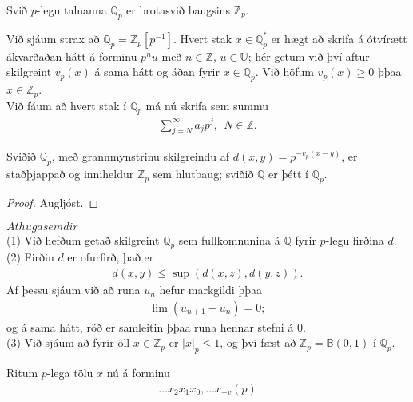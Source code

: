 \begin{skilgr}
 Svið $p$-legu talnanna $\mathbb{Q}_p$ er brotasvið baugsins $\mathbb{Z}_p$.
\end{skilgr}
Við sjáum strax að $\mathbb{Q}_p = \mathbb{Z}_p[p^{-1}]$. Hvert stak 
$x \in \mathbb{Q}_p^*$ er hægt að skrifa á ótvírætt ákvarðaðan hátt á forminu 
$p^nu$ með $n \in \mathbb{Z}$, $u \in \mathbb{U}$; hér getum við því aftur 
skilgreint $v_p(x)$ á sama hátt og áðan fyrir $x \in \mathbb{Q}_p$. 
Við höfum $v_p(x) \geq 0$ þþaa $x \in \mathbb{Z}_p$. 
\\Við fáum að hvert stak í $\mathbb{Q}_p$ má nú skrifa sem summu
\begin{align*}
 \sum_{j=N}^{\infty} a_jp^j,\ \ N \in \mathbb{Z}.
\end{align*}
\begin{setn}
 Sviðið $\mathbb{Q}_p$, með grannmynstrinu skilgreindu af 
$d(x,y) = p^{-v_p(x-y)}$, er staðþjappað og inniheldur $\mathbb{Z}_p$ sem 
hlutbaug; sviðið $\mathbb{Q}$ er þétt í $\mathbb{Q}_p$.
\end{setn}
\begin{proof}
 Augljóst.
\end{proof}
$Athugasemdir$\\
(1) Við hefðum getað skilgreint $\mathbb{Q}_p$ sem fullkomnunina á $\mathbb{Q}$ 
fyrir $p$-legu firðina $d$.\\
(2) Firðin $d$ er ofurfirð, það er 
\begin{align*}
 d(x,y) \leq \sup (d(x,z),d(y,z)).
\end{align*}
Af þessu sjáum við að runa $u_n$ hefur markgildi þþaa 
\begin{align*}
 \lim(u_{n+1} - u_n) = 0;
\end{align*}
og á sama hátt, röð er samleitin þþaa runa hennar stefni á 0.\\
(3) Við sjáum að fyrir öll $x \in \mathbb{Z}_p$ er $|x|_p \leq 1$, og því fæst að $\mathbb{Z}_p = \mathbb{B}(0,1) $ í $\mathbb{Q}_p$.
\begin{Rit}
Ritum $p$-lega tölu $x$ nú á forminu
\begin{align*}
 \ldots x_2 x_1x_0, \ldots x_{-v} (p)
\end{align*}
\end{Rit}
